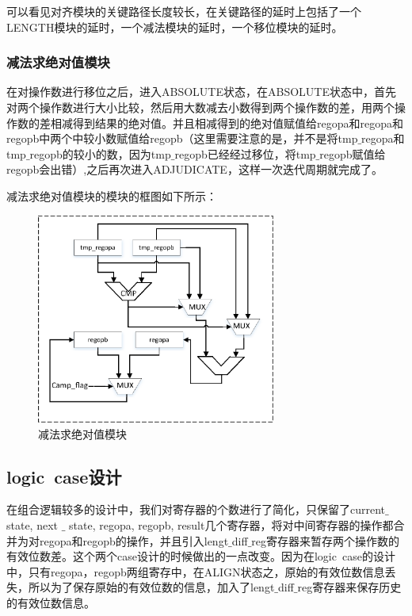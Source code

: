 \documentclass[12pt]{article}
\begin{document}
可以看见对齐模块的关键路径长度较长，在关键路径的延时上包括了一个LENGTH模块的延时，一个减法模块的延时，一个移位模块的延时。

\subsubsection{减法求绝对值模块}
在对操作数进行移位之后，进入ABSOLUTE状态，在ABSOLUTE状态中，首先对两个操作数进行大小比较，然后用大数减去小数得到两个操作数的差，用两个操作数的差相减得到结果的绝对值。并且相减得到的绝对值赋值给regopa和regopa和regopb中两个中较小数赋值给regopb（这里需要注意的是，并不是将tmp$\_$regopa和tmp$\_$regopb的较小的数，因为tmp$\_$regopb已经经过移位，将tmp$\_$regopb赋值给regopb会出错）,之后再次进入ADJUDICATE，这样一次迭代周期就完成了。

减法求绝对值模块的模块的框图如下所示：

\begin{figure}[H]
\begin{center}
\includegraphics[width=0.7\textwidth]{./lowpowerdesign/abosulate.eps}
\caption{减法求绝对值模块}
\label{align_model}
\end{center}
\end{figure}


\subsection{logic~case设计}
在组合逻辑较多的设计中，我们对寄存器的个数进行了简化，只保留了current$\_$state, next $\_$ state, regopa, regopb, result几个寄存器，将对中间寄存器的操作都合并为对regopa和regopb的操作，并且引入lengt$\_$diff$\_$reg寄存器来暂存两个操作数的有效位数差。这个两个case设计的时候做出的一点改变。因为在logic~case的设计中，只有regopa，regopb两组寄存中，在ALIGN状态之，原始的有效位数信息丢失，所以为了保存原始的有效位数的信息，加入了lengt$\_$diff$\_$reg寄存器来保存历史的有效位数信息。
\end{document}
